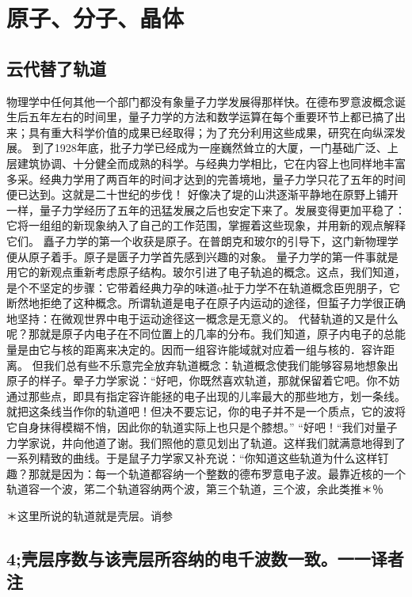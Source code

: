 \chapter{原子、分子、晶体}

\section{云代替了轨道}

物理学中任何其他一个部门都没有象量子力学发展得那样快。在德布罗意波概念诞生后五年左右的时间里，量子力学的方法和数学运算在每个重要环节上都已搞了出来；具有重大科学价值的成果已经取得；为了充分利用这些成果，研究在向纵深发展。
到了1928年底，批子力学已经成为一座巍然耸立的大厦，一门基础广泛、上层建筑协调、十分健全而成熟的科学。与经典力学相比，它在内容上也同样地丰富多采。经典力学用了两百年的时间才达到的完善境地，量子力学只花了五年的时间便已达到。这就是二十世纪的步伐！
好像决了堤的山洪逐渐平静地在原野上铺开一样，量子力学经历了五年的迅猛发展之后也安定下来了。发展变得更加平稳了：它将一组组的新现象纳入了自己的工作范围，掌握着这些现象，并用新的观点解释它们。
矗子力学的第一个收获是原子。在普朗克和玻尔的引导下，这门新物理学便从原子着手。原子是匮子力学首先感到兴趣的对象。
量子力学的第一件事就是用它的新观点重新考虑原子结构。玻尔引进了电子轨追的概念。这点，我们知道，是个不坚定的步骤：它带着经典力孕的味道o扯于力学不在轨道概念臣兜朋子，它断然地拒绝了这种概念。所谓轨道是电子在原子内运动的途径，但蜇子力学很正确地坚持：在微观世界中电于运动途径这一概念是无意义的。
代替轨道的又是什么呢？那就是原子内电子在不同位置上的几率的分布。我们知道，原子内电子的总能量是由它与核的距离来决定的。因而一组容许能域就对应着一组与核的．容许距离。
但我们总有些不乐意完全放弃轨道概念：轨道概念使我们能够容易地想象出原子的样子。晕子力学家说：“好吧，你既然喜欢轨道，那就保留着它吧。你不妨通过那些点，即具有指定容许能拯的电子出现的儿率最大的那些地方，划一条线。就把这条线当作你的轨道吧！但决不要忘记，你的电子并不是一个质点，它的波将它自身抹得模糊不悄，因此你的轨道实际上也只是个膝想。”
“好吧！“我们对量子力学家说，井向他道了谢。我们照他的意见划出了轨道。这样我们就满意地得到了一系列精致的曲线。于是鼠子力学家又补充说：“你知道这些轨道为什么这样钉趣？那就是因为：每一个轨道都容纳一个整数的德布罗意电子波。最靠近核的一个轨道容一个波，笫二个轨道容纳两个波，第三个轨道，三个波，余此类推＊％

＊这里所说的轨道就是壳层。诮参\section{4;壳层序数与该壳层所容纳的电千波数一致。一一译者注}

